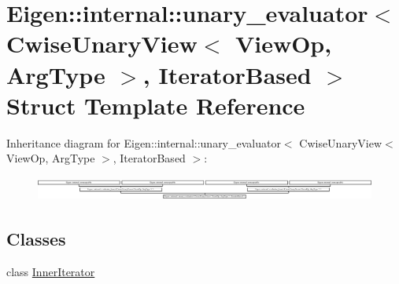 \hypertarget{struct_eigen_1_1internal_1_1unary__evaluator_3_01_cwise_unary_view_3_01_view_op_00_01_arg_type_01_4_00_01_iterator_based_01_4}{}\section{Eigen\+:\+:internal\+:\+:unary\+\_\+evaluator$<$ Cwise\+Unary\+View$<$ View\+Op, Arg\+Type $>$, Iterator\+Based $>$ Struct Template Reference}
\label{struct_eigen_1_1internal_1_1unary__evaluator_3_01_cwise_unary_view_3_01_view_op_00_01_arg_type_01_4_00_01_iterator_based_01_4}
Inheritance diagram for Eigen\+:\+:internal\+:\+:unary\+\_\+evaluator$<$ Cwise\+Unary\+View$<$ View\+Op, Arg\+Type $>$, Iterator\+Based $>$\+:\begin{figure}[H]
\begin{center}
\leavevmode
\includegraphics[height=0.792453cm]{struct_eigen_1_1internal_1_1unary__evaluator_3_01_cwise_unary_view_3_01_view_op_00_01_arg_type_01_4_00_01_iterator_based_01_4}
\end{center}
\end{figure}
\subsection*{Classes}
\begin{DoxyCompactItemize}
\item 
class \hyperlink{class_eigen_1_1internal_1_1unary__evaluator_3_01_cwise_unary_view_3_01_view_op_00_01_arg_type_011a5afe598192a9657664b0cfbd26765b}{Inner\+Iterator}
\end{DoxyCompactItemize}
